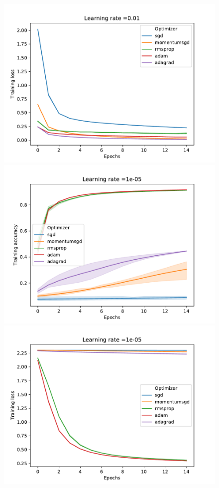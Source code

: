\documentclass[letterpaper]{article}
\providecommand{\1}{\mathbf{1}}
\providecommand{\0}{\mathbf{0}}
\begin{document}
\begin{figure}
\begin{minipage}{.45\textwidth}
        \end{minipage}
        \begin{minipage}{.45\textwidth}
         \includegraphics[width=.9\textwidth]{loss_001}
        \end{minipage}
        \begin{minipage}{.45\textwidth}
         \includegraphics[width=.9\textwidth]{acc_1e-05}
        \end{minipage}
        \begin{minipage}{.45\textwidth}
         \includegraphics[width=.9\textwidth]{loss_1e-05}

\end{minipage}
\end{figure}
\end{document}
